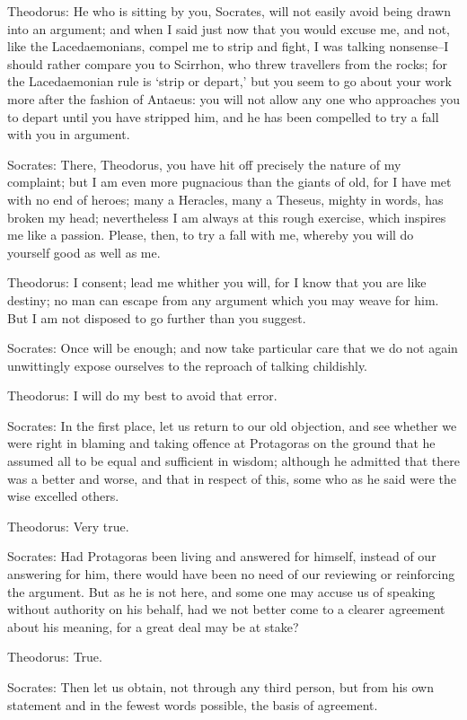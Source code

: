 Theodorus: He who is sitting by you, Socrates, will not easily avoid
being drawn into an argument; and when I said just now that you would
excuse me, and not, like the Lacedaemonians, compel me to strip and
fight, I was talking nonsense--I should rather compare you to Scirrhon,
who threw travellers from the rocks; for the Lacedaemonian rule is
`strip or depart,' but you seem to go about your work more after the
fashion of Antaeus: you will not allow any one who approaches you to
depart until you have stripped him, and he has been compelled to try a
fall with you in argument.

Socrates: There, Theodorus, you have hit off precisely the nature of my
complaint; but I am even more pugnacious than the giants of old, for I
have met with no end of heroes; many a Heracles, many a Theseus, mighty
in words, has broken my head; nevertheless I am always at this rough
exercise, which inspires me like a passion. Please, then, to try a fall
with me, whereby you will do yourself good as well as me.

Theodorus: I consent; lead me whither you will, for I know that you are
like destiny; no man can escape from any argument which you may weave
for him. But I am not disposed to go further than you suggest.

Socrates: Once will be enough; and now take particular care that we
do not again unwittingly expose ourselves to the reproach of talking
childishly.

Theodorus: I will do my best to avoid that error.

Socrates: In the first place, let us return to our old objection, and
see whether we were right in blaming and taking offence at Protagoras
on the ground that he assumed all to be equal and sufficient in wisdom;
although he admitted that there was a better and worse, and that in
respect of this, some who as he said were the wise excelled others.

Theodorus: Very true.

Socrates: Had Protagoras been living and answered for himself, instead
of our answering for him, there would have been no need of our reviewing
or reinforcing the argument. But as he is not here, and some one may
accuse us of speaking without authority on his behalf, had we not better
come to a clearer agreement about his meaning, for a great deal may be
at stake?

Theodorus: True.

Socrates: Then let us obtain, not through any third person, but from his
own statement and in the fewest words possible, the basis of agreement.

